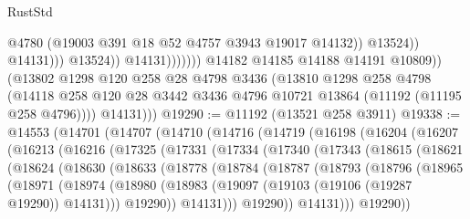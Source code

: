 \begin{lexlean}{RustStd}
\begin{coremodule}
                                          @4780
                                          (@19003 @391 @18 @52 @4757 @3943 @19017 @14132))
                                        @13524))
                                    @14131)))
                              @13524))
                          @14131)))))))
            @14182
            @14185
            @14188
            @14191
            @10809))
        (@13802
          @1298
          @120
          @258
          @28
          @4798
          @3436
          (@13810
            @1298
            @258
            @4798
            (@14118 @258 @120 @28 @3442 @3436 @4796 @10721 @13864 (@11192 (@11195 @258 @4796))))
          @14131)))
@19290 := @11192 (@13521 @258 @3911)
@19338 := @14553
    (@14701
      (@14707
        (@14710
          (@14716
            (@14719
              (@16198
                (@16204
                  (@16207
                    (@16213
                      (@16216
                        (@17325
                          (@17331
                            (@17334
                              (@17340
                                (@17343
                                  (@18615
                                    (@18621
                                      (@18624
                                        (@18630
                                          (@18633
                                            (@18778
                                              (@18784
                                                (@18787
                                                  (@18793
                                                    (@18796
                                                      (@18965
                                                        (@18971
                                                          (@18974
                                                            (@18980
                                                              (@18983
                                                                (@19097
                                                                  (@19103
                                                                    (@19106 (@19287 @19290))
                                                                    @14131)))
                                                              @19290))
                                                          @14131)))
                                                    @19290))
                                                @14131)))
                                          @19290))

\end{coremodule}
\end{lexlean}

